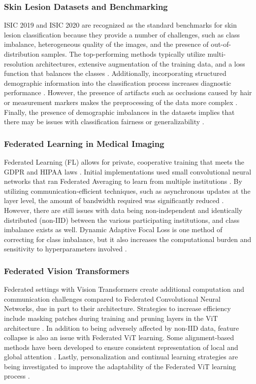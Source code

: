 \documentclass[utf8]{FrontiersinHarvard} %
\begin{document}
\subsubsection{Skin Lesion Datasets and Benchmarking}
ISIC 2019 and ISIC 2020 are recognized as the standard benchmarks for skin lesion classification because they provide a number of challenges, such as class imbalance, heterogeneous quality of the images, and the presence of out-of-distribution samples. The top-performing methods typically utilize multi-resolution architectures, extensive augmentation of the training data, and a loss function that balances the classes \citep{Gessert2020}. Additionally, incorporating structured demographic information into the classification process increases diagnostic performance \citep{Nunnari2020}. However, the presence of artifacts such as occlusions caused by hair or measurement markers makes the preprocessing of the data more complex \citep{Wegley2026}. Finally, the presence of demographic imbalances in the datasets implies that there may be issues with classification fairness or generalizability \citep{SkinDiversity2024}.
\subsubsection{Federated Learning in Medical Imaging}
Federated Learning (FL) allows for private, cooperative training that meets the GDPR and HIPAA laws \citep{Guan2024}. Initial implementations used small convolutional neural networks that ran Federated Averaging to learn from multiple institutions \citep{Subramanian2025}. By utilizing communication-efficient techniques, such as asynchronous updates at the layer level, the amount of bandwidth required was significantly reduced \citep{Yaqoob2023}. However, there are still issues with data being non-independent and identically distributed (non-IID) between the various participating institutions, and class imbalance exists as well. Dynamic Adaptive Focal Loss is one method of correcting for class imbalance, but it also increases the computational burden and sensitivity to hyperparameters involved \citep{Zhao2025}.
\subsubsection{Federated Vision Transformers}
Federated settings with Vision Transformers create additional computation and communication challenges compared to Federated Convolutional Neural Networks, due in part to their architecture. Strategies to increase efficiency include masking patches during training \citep{Wu2024} and pruning layers in the ViT architecture \citep{Paxton2024}. In addition to being adversely affected by non-IID data, feature collapse is also an issue with Federated ViT learning. Some alignment-based methods have been developed to ensure consistent representation of local and global attention \citep{Darzi2024}. Lastly, personalization and continual learning strategies are being investigated to improve the adaptability of the Federated ViT learning process \citep{Zuo2024,Yao2024}.
\end{document}
